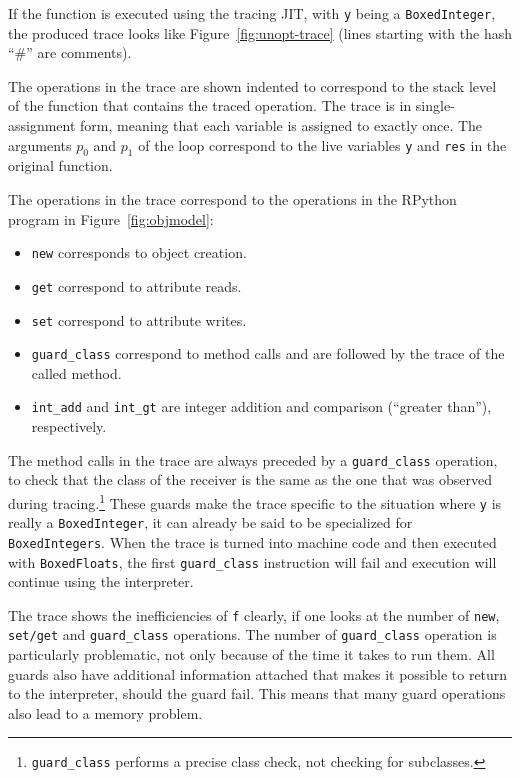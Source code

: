 \documentclass[preprint]{sigplanconf}
\begin{document}
If the function is executed using the tracing JIT, with \lstinline{y} being a
\lstinline{BoxedInteger}, the produced trace looks like
Figure~\ref{fig:unopt-trace} (lines starting with the hash ``\#'' are comments).

The operations in the trace are shown indented to
correspond to the stack level of the function that contains the traced
operation. The trace is in single-assignment form, meaning that each variable is
assigned to exactly once. The arguments $p_0$ and $p_1$ of the loop correspond
to the live variables \lstinline{y} and \lstinline{res} in the original function.

The operations in the trace correspond to the operations in the RPython program
in Figure~\ref{fig:objmodel}:

\begin{itemize}
    \item \lstinline{new} corresponds to object creation.
    \item \lstinline{get} correspond to attribute reads.
    \item \lstinline{set} correspond to attribute writes.
    \item \lstinline{guard_class} correspond to method calls and are followed by
    the trace of the called method.
    \item \lstinline{int_add} and \lstinline{int_gt} are integer addition and
    comparison (``greater than''), respectively.
\end{itemize}

The method calls in the trace are always preceded by a \lstinline{guard_class}
operation, to check that the class of the receiver is the same as the one that
was observed during tracing.\footnote{\lstinline{guard_class} performs a precise
class check, not checking for subclasses.} These guards make the trace specific
to the situation where \lstinline{y} is really a \lstinline{BoxedInteger}, it can
already be said to be specialized for \lstinline{BoxedIntegers}. When the trace is
turned into machine code and then executed with \lstinline{BoxedFloats}, the
first \lstinline{guard_class} instruction will fail and execution will continue
using the interpreter.

The trace shows the inefficiencies of \lstinline{f} clearly, if one looks at
the number of \lstinline{new}, \lstinline{set/get} and \lstinline{guard_class}
operations. The number of \lstinline{guard_class} operation is particularly
problematic, not only because of the time it takes to run them. All guards also
have additional information attached that makes it possible to return to the
interpreter, should the guard fail. This means that many guard operations also
lead to a memory problem.
\end{document}
